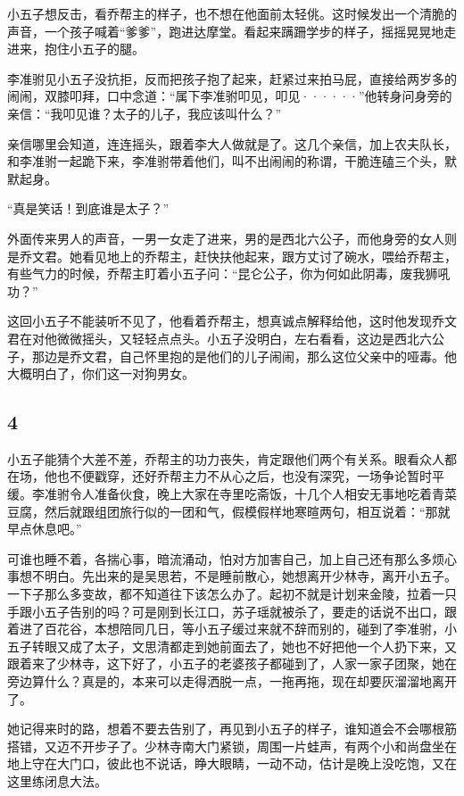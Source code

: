 小五子想反击，看乔帮主的样子，也不想在他面前太轻佻。这时候发出一个清脆的声音，一个孩子喊着“爹爹”，跑进达摩堂。看起来蹒跚学步的样子，摇摇晃晃地走进来，抱住小五子的腿。

李准驸见小五子没抗拒，反而把孩子抱了起来，赶紧过来拍马屁，直接给两岁多的闹闹，双膝叩拜，口中念道：“属下李准驸叩见，叩见······”他转身问身旁的亲信：“我叩见谁？太子的儿子，我应该叫什么？”

亲信哪里会知道，连连摇头，跟着李大人做就是了。这几个亲信，加上农夫队长，和李准驸一起跪下来，李准驸带着他们，叫不出闹闹的称谓，干脆连磕三个头，默默起身。

“真是笑话！到底谁是太子？”

外面传来男人的声音，一男一女走了进来，男的是西北六公子，而他身旁的女人则是乔文君。她看见地上的乔帮主，赶快扶他起来，跟方丈讨了碗水，喂给乔帮主，有些气力的时候，乔帮主盯着小五子问：“昆仑公子，你为何如此阴毒，废我狮吼功？”

这回小五子不能装听不见了，他看着乔帮主，想真诚点解释给他，这时他发现乔文君在对他微微摇头，又轻轻点点头。小五子没明白，左右看看，这边是西北六公
子，那边是乔文君，自己怀里抱的是他们的儿子闹闹，那么这位父亲中的哑毒。他大概明白了，你们这一对狗男女。
\newline

{\centering\subsection{4}}

小五子能猜个大差不差，乔帮主的功力丧失，肯定跟他们两个有关系。眼看众人都在场，他也不便戳穿，还好乔帮主力不从心之后，也没有深究，一场争论暂时平缓。李准驸令人准备伙食，晚上大家在寺里吃斋饭，十几个人相安无事地吃着青菜豆腐，然后就跟组团旅行似的一团和气，假模假样地寒暄两句，相互说着：“那就早点休息吧。”

可谁也睡不着，各揣心事，暗流涌动，怕对方加害自己，加上自己还有那么多烦心事想不明白。先出来的是吴思若，不是睡前散心，她想离开少林寺，离开小五子。一下子那么多变故，都不知道往下该怎么办了。起初不就是计划来金陵，拉着一只手跟小五子告别的吗？可是刚到长江口，苏子瑶就被杀了，要走的话说不出口，跟着进了百花谷，本想陪同几日，等小五子缓过来就不辞而别的，碰到了李准驸，小五子转眼又成了太子，文思清都走到她前面去了，她也不好把他一个人扔下来，又跟着来了少林寺，这下好了，小五子的老婆孩子都碰到了，人家一家子团聚，她在旁边算什么？真是的，本来可以走得洒脱一点，一拖再拖，现在却要灰溜溜地离开了。

她记得来时的路，想着不要去告别了，再见到小五子的样子，谁知道会不会哪根筋搭错，又迈不开步子了。少林寺南大门紧锁，周围一片蛙声，有两个小和尚盘坐在地上守在大门口，彼此也不说话，睁大眼睛，一动不动，估计是晚上没吃饱，又在这里练闭息大法。

